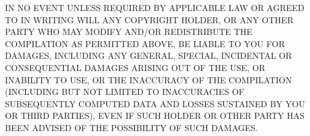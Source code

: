   IN NO EVENT UNLESS REQUIRED BY APPLICABLE LAW OR AGREED TO IN
  WRITING WILL ANY COPYRIGHT HOLDER, OR ANY OTHER PARTY WHO MAY MODIFY
  AND/OR REDISTRIBUTE THE COMPILATION AS PERMITTED ABOVE, BE LIABLE TO
  YOU FOR DAMAGES, INCLUDING ANY GENERAL, SPECIAL, INCIDENTAL OR
  CONSEQUENTIAL DAMAGES ARISING OUT OF THE USE, OR INABILITY TO USE,
  OR THE INACCURACY OF THE COMPILATION (INCLUDING BUT NOT LIMITED TO
  INACCURACIES OF SUBSEQUENTLY COMPUTED DATA AND LOSSES SUSTAINED BY
  YOU OR THIRD PARTIES), EVEN IF SUCH HOLDER OR OTHER PARTY HAS BEEN
  ADVISED OF THE POSSIBILITY OF SUCH DAMAGES.

